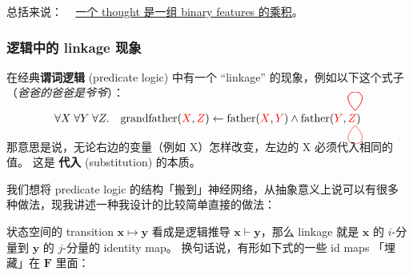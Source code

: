 \documentclass[orivec]{llncs}
\newcommand{\emp}[1]{\textbf{#1}}
\newcommand{\vect}[1]{\boldsymbol{#1}}
\newcommand{\tikzmark}[1]{\tikz[overlay,remember picture] \node (#1) {};}
\begin{document}
总括来说： ~ \uline{一个 thought 是一组 binary features 的乘积}。 %


\subsubsection{逻辑中的 linkage 现象}

在经典\textbf{谓词逻辑} (predicate logic) 中有一个 ``linkage'' 的现象，例如以下这个式子（\textit{爸爸的爸爸是爷爷}）：

\begin{equation}
\forall X \; \forall Y \; \forall Z.  \quad  \text{grandfather}({\color{red}X} \tikzmark{x}, {\color{red}Z} \tikzmark{z}) \leftarrow \text{father}({\color{red}X} \tikzmark{p}, {\color{red}Y} \tikzmark{y}) \wedge \mbox{father}({\color{red}Y} \tikzmark{q}, {\color{red}Z} \tikzmark{r})
\begin{tikzpicture}[overlay,remember picture,out=45,in=135,distance=1.1cm]
  \draw[-,red, transform canvas={shift={(-5pt,10pt)}}] (x.center) to (p.center);
  \draw[-,red, transform canvas={shift={(-5pt,10pt)}}] (y.center) to (q.center);
  \draw[-,red, transform canvas={shift={(-5pt,-3pt)}}, out=-45,in=225] (z.center) to (r.center);
\end{tikzpicture}
\label{linkage-father}
\end{equation}

那意思是说，无论右边的变量（例如 X）怎样改变，左边的 X 必须代入相同的值。 这是 \emp{代入} (substitution) 的本质。



我们想将 predicate logic 的结构「搬到」神经网络，从抽象意义上说可以有很多种做法，现我讲述一种我设计的比较简单直接的做法：  

状态空间的 transition $\vect{x} \mapsto \vect{y}$ 看成是逻辑推导 $\vect{x} \vdash \vect{y}$，那么 linkage 就是 $\vect{x}$ 的 $i$-分量到 $\vect{y}$ 的 $j$-分量的 identity map。 换句话说，有形如下式的一些 id maps 「埋藏」在 $\vect{F}$ 里面：
\end{document}
